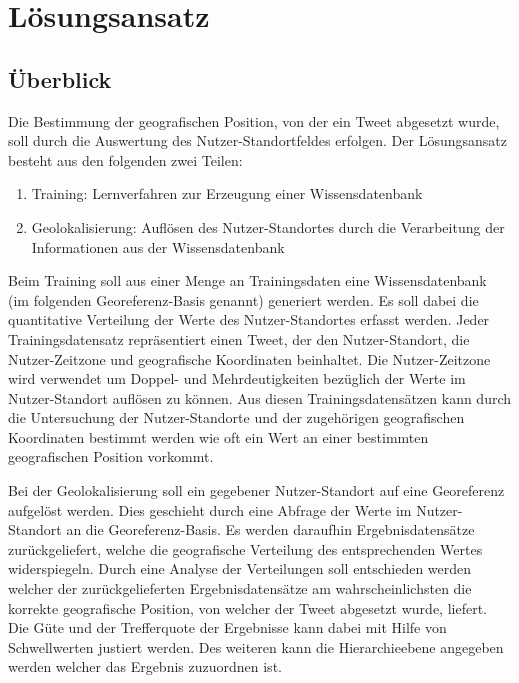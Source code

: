 \chapter{Lösungsansatz} \label{chp:Loesungsansatz}
	
	\section{Überblick} 

		Die Bestimmung der geografischen Position, von der ein Tweet abgesetzt wurde, soll durch die Auswertung des Nutzer-Standortfeldes erfolgen. 
		Der Lösungsansatz besteht aus den folgenden zwei Teilen:

		\begin{enumerate}
			\item Training: Lernverfahren zur Erzeugung einer Wissensdatenbank 
			\item Geolokalisierung: Auflösen des Nutzer-Standortes durch die Verarbeitung der Informationen aus der Wissensdatenbank
		\end{enumerate}

		Beim Training soll aus einer Menge an Trainingsdaten eine Wissensdatenbank (im folgenden Georeferenz-Basis genannt) generiert werden.
		Es soll dabei die quantitative Verteilung der Werte des Nutzer-Standortes erfasst werden.
		Jeder Trainingsdatensatz repräsentiert einen Tweet, der den Nutzer-Standort, die Nutzer-Zeitzone und geografische Koordinaten beinhaltet.
		Die Nutzer-Zeitzone wird verwendet um Doppel- und Mehrdeutigkeiten bezüglich der Werte im Nutzer-Standort auflösen zu können. 
		Aus diesen Trainingsdatensätzen kann durch die Untersuchung der Nutzer-Standorte und der zugehörigen geografischen Koordinaten bestimmt werden wie oft ein Wert an einer bestimmten geografischen Position vorkommt.

		Bei der Geolokalisierung soll ein gegebener Nutzer-Standort auf eine Georeferenz aufgelöst werden. 
		Dies geschieht durch eine Abfrage der Werte im Nutzer-Standort an die Georeferenz-Basis.
		Es werden daraufhin Ergebnisdatensätze zurückgeliefert, welche die geografische Verteilung des entsprechenden Wertes widerspiegeln.
		Durch eine Analyse der Verteilungen soll entschieden werden welcher der zurückgelieferten Ergebnisdatensätze am wahrscheinlichsten die korrekte geografische Position, von welcher der Tweet abgesetzt wurde, liefert.
		Die Güte und der Trefferquote der Ergebnisse kann dabei mit Hilfe von Schwellwerten justiert werden.
		Des weiteren kann die Hierarchieebene angegeben werden welcher das Ergebnis zuzuordnen ist.

